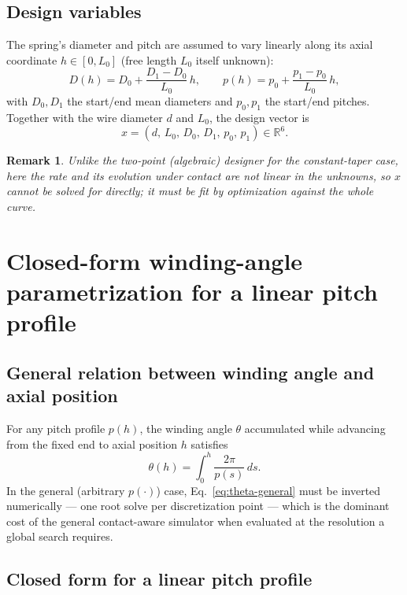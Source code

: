 \documentclass[11pt]{article}
\newtheorem{remark}{Remark}
\begin{document}
\subsection{Design variables}

The spring's diameter and pitch are assumed to vary linearly along its
axial coordinate $h\in[0,L_0]$ (free length $L_0$ itself unknown):
\begin{equation}
D(h) = D_0 + \frac{D_1 - D_0}{L_0}\,h, \qquad
p(h) = p_0 + \frac{p_1 - p_0}{L_0}\,h,
\label{eq:linear-profiles}
\end{equation}
with $D_0,D_1$ the start/end mean diameters and $p_0,p_1$ the start/end
pitches. Together with the wire diameter $d$ and $L_0$, the design vector
is
\begin{equation}
x = (d,\, L_0,\, D_0,\, D_1,\, p_0,\, p_1) \in \mathbb{R}^6 .
\label{eq:design-vector}
\end{equation}

\begin{remark}
Unlike the two-point (algebraic) designer for the constant-taper case,
here the rate and its evolution under contact are not linear in the
unknowns, so $x$ cannot be solved for directly; it must be fit by
optimization against the whole curve.
\end{remark}

\section{Closed-form winding-angle parametrization for a linear pitch profile}
\label{sec:closed-form}

\subsection{General relation between winding angle and axial position}

For any pitch profile $p(h)$, the winding angle $\theta$ accumulated
while advancing from the fixed end to axial position $h$ satisfies
\begin{equation}
\theta(h) = \int_0^h \frac{2\pi}{p(s)}\,ds .
\label{eq:theta-general}
\end{equation}
In the general (arbitrary $p(\cdot)$) case, Eq.~\eqref{eq:theta-general}
must be inverted numerically — one root solve per discretization point —
which is the dominant cost of the general contact-aware simulator when
evaluated at the resolution a global search requires.

\subsection{Closed form for a linear pitch profile}
\end{document}
